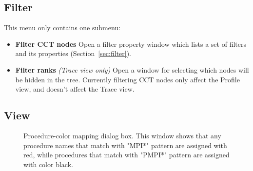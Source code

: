 
\subsection{Filter}
This menu only contains one submenu:
\begin{itemize}
 \item \textbf{Filter CCT nodes}
  Open a filter property window which lists a set of filters and its properties (Section~\ref{sec:filter}).

 \item \textbf{Filter ranks} \textit{(Trace view only)}
  Open a window for selecting which nodes will be hidden in the tree.
  Currently filtering CCT nodes only affect the Profile view, and doesn't affect the Trace view.

\end{itemize}


\subsection{View}

\begin{figure}[t]
\caption{Procedure-color mapping dialog box. This window shows that any procedure names that match with "MPI*" pattern are assigned with red, while procedures that match with "PMPI*" pattern are assigned with color black.}
\label{fig:hpctraceviewer-mapping}
\end{figure}


